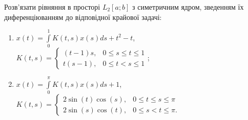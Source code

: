 \begin{exercise}
    Розв'язати рівняння в просторі $L_2[a;b]$ з симетричним ядром, зведенням їх диференціюванням
    до відповідної крайової задачі:
    \begin{enumerate}
        \item $x(t) = \int\limits^1_0 K(t,s) x(s) ds + t^2 - t$,
        $K(t,s) = \begin{cases}
            (t-1)s, & 0 \leq s \leq t \leq 1 \\
            t(s-1), & 0 \leq t < s \leq 1
        \end{cases}$;
        \item $x(t) = \int\limits^\pi_0 K(t,s) x(s) ds + 1$,\
        $K(t,s) = \begin{cases}
            2 \sin (t) \cos (s), & 0 \leq t \leq s \leq \pi \\
            2 \sin (s) \cos (t), & 0 \leq s < t \leq \pi .
        \end{cases}$
    \end{enumerate}
\end{exercise}
